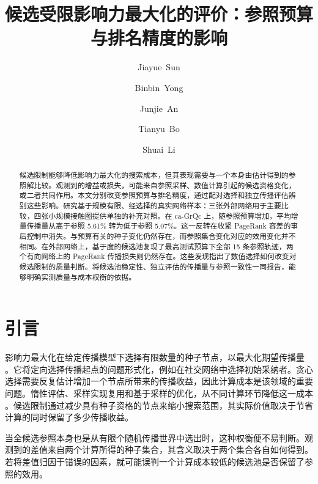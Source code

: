 \documentclass[smallextended]{svjour3}
\begin{document}
\def\abstractname{摘要}\def\keywordname{\textbf{关键词}}\def\figurename{图}\def\tablename{表}\def\refname{参考文献}
\title{候选受限影响力最大化的评价：参照预算与排名精度的影响}
\author{\mbox{Jiayue Sun} \and \mbox{Binbin Yong} \and \mbox{Junjie An} \and \mbox{Tianyu Bo} \and \mbox{Shuai Li}}
\date{}
\maketitle
\begin{abstract}
候选限制能够降低影响力最大化的搜索成本，但其表现需要与一个本身由估计得到的参照解比较。观测到的增益或损失，可能来自参照采样、数值计算引起的候选资格变化，或二者共同作用。本文分别改变参照预算与排名精度，通过配对选择和独立传播评估辨别这些影响。研究基于规模有限、经选择的真实网络样本：三张外部网络用于主要比较，四张小规模接触图提供单独的补充对照。在 ca-GrQc 上，随参照预算增加，平均增量传播量从高于参照 5.61\% 转为低于参照 5.07\%。这一反转在收紧 PageRank 容差的事后控制中消失。与预算有关的种子变化仍然存在，而参照集合变化对应的效用变化并不相同。在外部网络上，基于度的候选池复现了最高测试预算下全部 15 条参照轨迹，两个有向网络上的 PageRank 传播损失则仍然存在。这些发现指出了数值选择如何改变对候选限制的质量判断。将候选池稳定性、独立评估的传播量与参照一致性一同报告，能够明确实测质量与成本权衡的依据。
\end{abstract}

\section{引言}
影响力最大化在给定传播模型下选择有限数量的种子节点，以最大化期望传播量 \cite{ref1}。它将定向选择传播起点的问题形式化，例如在社交网络中选择初始采纳者。贪心选择需要反复估计增加一个节点所带来的传播收益，因此计算成本是该领域的重要问题。惰性评估、采样实现复用和基于采样的优化，从不同计算环节降低这一成本 \cite{ref7,ref8,ref2}。候选限制通过减少具有种子资格的节点来缩小搜索范围，其实际价值取决于节省计算的同时保留了多少传播收益。

当全候选参照本身也是从有限个随机传播世界中选出时，这种权衡便不易判断。观测到的差值来自两个计算所得的种子集合，其含义取决于两个集合各自如何得到。若将差值归因于错误的因素，就可能误判一个计算成本较低的候选池是否保留了参照的效用。
\end{document}
